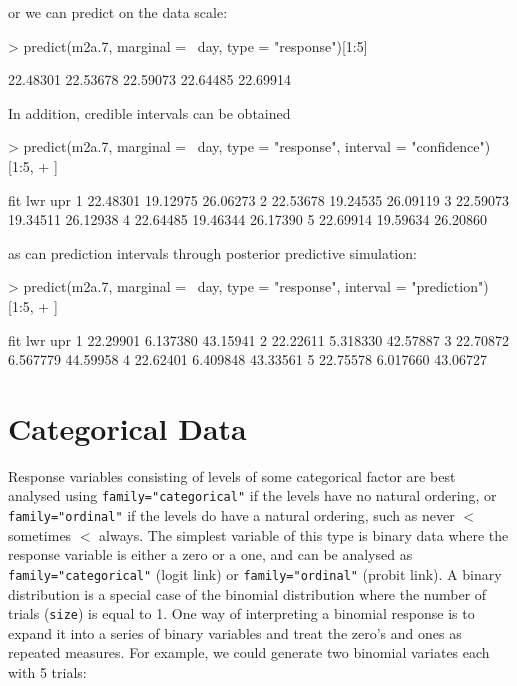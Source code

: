 \documentclass{article}
\begin{document}
or we can predict on the data scale:

\begin{Schunk}
\begin{Sinput}
> predict(m2a.7, marginal = ~day, type = "response")[1:5]
\end{Sinput}
\begin{Soutput}
[1] 22.48301 22.53678 22.59073 22.64485 22.69914
\end{Soutput}
\end{Schunk}

In addition, credible intervals can be obtained 

\begin{Schunk}
\begin{Sinput}
> predict(m2a.7, marginal = ~day, type = "response", interval = "confidence")[1:5, 
+     ]
\end{Sinput}
\begin{Soutput}
       fit      lwr      upr
1 22.48301 19.12975 26.06273
2 22.53678 19.24535 26.09119
3 22.59073 19.34511 26.12938
4 22.64485 19.46344 26.17390
5 22.69914 19.59634 26.20860
\end{Soutput}
\end{Schunk}

as can prediction intervals through posterior predictive simulation:

\begin{Schunk}
\begin{Sinput}
> predict(m2a.7, marginal = ~day, type = "response", interval = "prediction")[1:5, 
+     ]
\end{Sinput}
\begin{Soutput}
       fit      lwr      upr
1 22.29901 6.137380 43.15941
2 22.22611 5.318330 42.57887
3 22.70872 6.567779 44.59958
4 22.62401 6.409848 43.33561
5 22.75578 6.017660 43.06727
\end{Soutput}
\end{Schunk}

\section{Categorical Data}

Response variables consisting of levels of some categorical factor are best analysed using \texttt{family="categorical"} if the levels have no natural ordering,  or \texttt{family="ordinal"} if the levels do have a natural ordering, such as never $<$ sometimes $<$ always. The simplest variable of this type is binary data where the response variable is either a zero or a one, and can be analysed as \texttt{family="categorical"} (logit link) or \texttt{family="ordinal"} (probit link).   A binary distribution is a special case of the binomial distribution where the number of trials (\texttt{size}) is equal to 1. One way of interpreting a binomial response is to expand it into a series of binary variables and treat the zero's and ones as repeated measures. For example, we could generate two binomial variates each with 5 trials:
\end{document}
